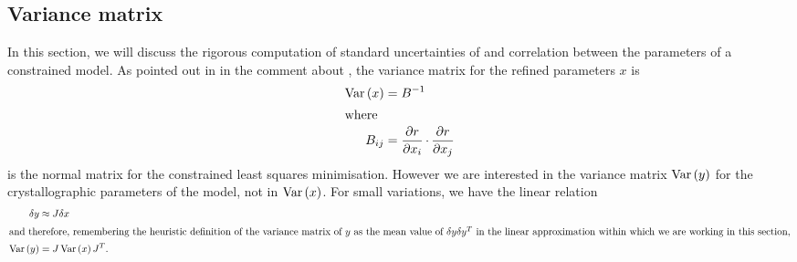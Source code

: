 \documentclass[pdf]{iucr}
\begin{document}
\subsection{Variance matrix}
In this section, we will discuss the rigorous computation of standard uncertainties of and correlation between the parameters of a constrained model. As pointed out in  in the comment about , the variance matrix for the refined parameters $x$ is
\begin{align}
\mathrm{Var}\left(x\right) &= B^{-1}\\
\intertext{where}
B_{ij} &= \frac{\partial r}{\partial x_i} \operatorname{\cdot} \frac{\partial r}{\partial x_j}
\end{align}
is the normal matrix for the constrained least squares minimisation. However we are interested in the variance matrix $\mathrm{Var}\left(y\right)$ for the crystallographic parameters of the model, not in $\mathrm{Var}\left(x\right)$. For small variations, we have the linear relation
\begin{align}
\delta y &\approx J \delta x\\
\intertext{and therefore, remembering the heuristic definition of the variance matrix of $y$ as the mean value of $\delta y \delta y^T$ in the linear approximation within which we are working in this section,}
\mathrm{Var}\left(y\right) &= J\, \mathrm{Var}\left(x\right) J^T.
\end{align} 
\end{document}
